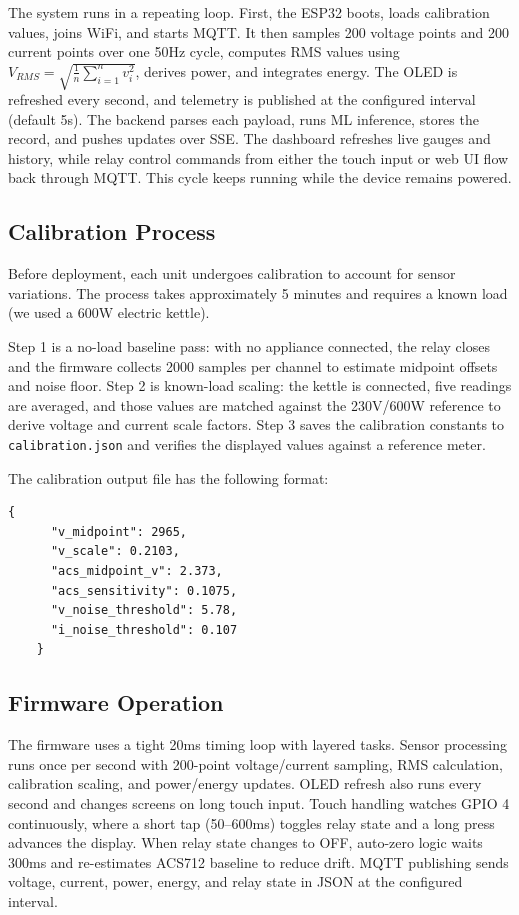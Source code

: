 \documentclass[12pt, a4paper]{article}
\numberwithin{figure}{section}
\numberwithin{table}{section}
\begin{document}
	The system runs in a repeating loop. First, the ESP32 boots, loads calibration values, joins WiFi, and starts MQTT. It then samples 200 voltage points and 200 current points over one 50Hz cycle, computes RMS values using $V_{RMS} = \sqrt{\frac{1}{n}\sum_{i=1}^{n} v_i^2}$, derives power, and integrates energy. The OLED is refreshed every second, and telemetry is published at the configured interval (default 5s). The backend parses each payload, runs ML inference, stores the record, and pushes updates over SSE. The dashboard refreshes live gauges and history, while relay control commands from either the touch input or web UI flow back through MQTT. This cycle keeps running while the device remains powered.
	
	\subsection{Calibration Process}
	
	Before deployment, each unit undergoes calibration to account for sensor variations. The process takes approximately 5 minutes and requires a known load (we used a 600W electric kettle).
	
	Step 1 is a no-load baseline pass: with no appliance connected, the relay closes and the firmware collects 2000 samples per channel to estimate midpoint offsets and noise floor. Step 2 is known-load scaling: the kettle is connected, five readings are averaged, and those values are matched against the 230V/600W reference to derive voltage and current scale factors. Step 3 saves the calibration constants to \texttt{calibration.json} and verifies the displayed values against a reference meter.
	
	The calibration output file has the following format:
	
	\begin{lstlisting}[basicstyle=\ttfamily\small, frame=single]
	{
	  "v_midpoint": 2965,
	  "v_scale": 0.2103,
	  "acs_midpoint_v": 2.373,
	  "acs_sensitivity": 0.1075,
	  "v_noise_threshold": 5.78,
	  "i_noise_threshold": 0.107
	}
	\end{lstlisting}
	
	\subsection{Firmware Operation}
	
	The firmware uses a tight 20ms timing loop with layered tasks. Sensor processing runs once per second with 200-point voltage/current sampling, RMS calculation, calibration scaling, and power/energy updates. OLED refresh also runs every second and changes screens on long touch input. Touch handling watches GPIO 4 continuously, where a short tap (50--600ms) toggles relay state and a long press advances the display. When relay state changes to OFF, auto-zero logic waits 300ms and re-estimates ACS712 baseline to reduce drift. MQTT publishing sends voltage, current, power, energy, and relay state in JSON at the configured interval.
	
\end{document}
